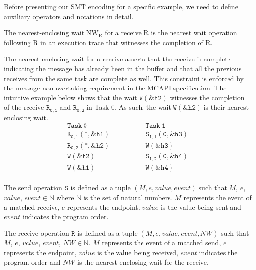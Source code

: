 Before presenting our SMT encoding for a specific example, we need to define auxiliary operators and notations in detail.
\noindent\begin{definition}
\noindent The nearest-enclosing wait $\mathrm{NW_R}$ for a receive $\mathrm{R}$ is the nearest wait operation following $\mathrm{R}$ in an execution trace that witnesses the completion of $\mathrm{R}$.
\end{definition}

The nearest-enclosing wait for a receive asserts that the receive is complete indicating the message has already been in the buffer and that all the previous receives from the same task are complete as well. This constraint is enforced by the message non-overtaking requirement in the MCAPI specification. The intuitive example below shows that the wait $\mathtt{W{(\&h2)}}$ witnesses the completion of the receive $\mathtt{R_{0,1}}$ and $\mathtt{R_{0,2}}$ in Task 0. As such, the wait $\mathtt{W{(\&h2)}}$ is their nearest-enclosing wait.
\[
\begin{array}{l|l}
\;\;\;\;\;\;\;\;\mathtt{Task\ 0}\;\;\;\;\;\;\;\; & \;\;\;\;\;\;\;\; \mathtt{Task\ 1}\;\;\;\;\;\;\;\; \\
\hline
\;\;\;\;\;\;\;\;\mathtt{R_{0,1}(*,\&h1)}\;\;\;\;\;\;\;\; & \;\;\;\;\;\;\;\; \mathtt{S_{1,1}(0,\&h3)}\;\;\;\;\;\;\;\; \\
\;\;\;\;\;\;\;\;\mathtt{R_{0,2}(*,\&h2)}\;\;\;\;\;\;\;\; & \;\;\;\;\;\;\;\; \mathtt{W{(\&h3)}}\;\;\;\;\;\;\;\; \\
\;\;\;\;\;\;\;\;\mathtt{W{(\&h2)}}\;\;\;\;\;\;\;\; & \;\;\;\;\;\;\;\; \mathtt{S_{1,2}(0,\&h4)}\;\;\;\;\;\;\;\; \\
\;\;\;\;\;\;\;\;\mathtt{W{(\&h1)}}\;\;\;\;\;\;\;\; & \;\;\;\;\;\;\;\; \mathtt{W{(\&h4)}}\;\;\;\;\;\;\;\; \\
\end{array}
\]

\begin{definition}
The send operation $\mathtt{S}$ is defined as a tuple $(M,e,value,event)$ such that $\mathit{M}$, $\mathit{e}$, $\mathit{value}$, $\mathit{event}$$ \in \mathbb{N}$ where $\mathbb{N}$ is the set of natural numbers. $M$ represents the event of a matched receive, $e$ represents the endpoint, $value$ is the value being sent and $event$ indicates the program order.
\label{def:snd}
\end{definition}

\begin{definition}
The receive operation $\mathtt{R}$ is defined as a tuple $(M,e,value,event,NW)$ such that $\mathit{M}$, $\mathit{e}$, $\mathit{value}$, $\mathit{event}$, $\mathit{NW}$$ \in \mathbb{N}$. $M$ represents the event of a matched send, $e$ represents the endpoint, $value$ is the value being received, $event$ indicates the program order and $\mathit{NW}$ is the nearest-enclosing wait for the receive.
\label{def:rcv}
\end{definition}

